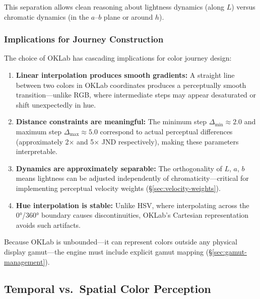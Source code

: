 This separation allows clean reasoning about lightness dynamics (along $L$) versus chromatic dynamics (in the $a$–$b$ plane or around $h$).

\subsubsection{Implications for Journey Construction}

The choice of OKLab has cascading implications for color journey design:

\begin{enumerate}
    \item \textbf{Linear interpolation produces smooth gradients:} A straight line between two colors in OKLab coordinates produces a perceptually smooth transition—unlike RGB, where intermediate steps may appear desaturated or shift unexpectedly in hue.
    
    \item \textbf{Distance constraints are meaningful:} The minimum step $\Delta_{\min} \approx 2.0$ and maximum step $\Delta_{\max} \approx 5.0$ correspond to actual perceptual differences (approximately 2× and 5× JND respectively), making these parameters interpretable.
    
    \item \textbf{Dynamics are approximately separable:} The orthogonality of $L$, $a$, $b$ means lightness can be adjusted independently of chromaticity—critical for implementing perceptual velocity weights (\S\ref{sec:velocity-weights}).
    
    \item \textbf{Hue interpolation is stable:} Unlike HSV, where interpolating across the 0°/360° boundary causes discontinuities, OKLab's Cartesian representation avoids such artifacts.
\end{enumerate}

Because OKLab is unbounded—it can represent colors outside any physical display gamut—the engine must include explicit gamut mapping (\S\ref{sec:gamut-management}).

\subsection{Temporal vs.\ Spatial Color Perception}
\label{sec:temporal-spatial}

